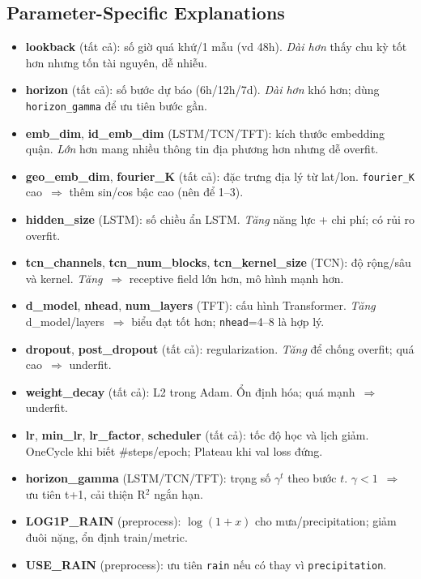 \documentclass[12pt,a4paper]{article}
\begin{document}
\subsection*{Parameter-Specific Explanations}
\begin{itemize}
    \item \textbf{lookback} (tất cả): số giờ quá khứ/1 mẫu (vd 48h). \emph{Dài hơn} thấy chu kỳ tốt hơn nhưng tốn tài nguyên, dễ nhiễu.
    \item \textbf{horizon} (tất cả): số bước dự báo (6h/12h/7d). \emph{Dài hơn} khó hơn; dùng \texttt{horizon\_gamma} để ưu tiên bước gần.
    \item \textbf{emb\_dim}, \textbf{id\_emb\_dim} (LSTM/TCN/TFT): kích thước embedding quận. \emph{Lớn} hơn mang nhiều thông tin địa phương hơn nhưng dễ overfit.
    \item \textbf{geo\_emb\_dim}, \textbf{fourier\_K} (tất cả): đặc trưng địa lý từ lat/lon. \texttt{fourier\_K} cao \,$\Rightarrow$ thêm sin/cos bậc cao (nên để 1--3).
    \item \textbf{hidden\_size} (LSTM): số chiều ẩn LSTM. \emph{Tăng} năng lực + chi phí; có rủi ro overfit.
    \item \textbf{tcn\_channels}, \textbf{tcn\_num\_blocks}, \textbf{tcn\_kernel\_size} (TCN): độ rộng/sâu và kernel. \emph{Tăng} \,$\Rightarrow$ receptive field lớn hơn, mô hình mạnh hơn.
    \item \textbf{d\_model}, \textbf{nhead}, \textbf{num\_layers} (TFT): cấu hình Transformer. \emph{Tăng} d\_model/layers \,$\Rightarrow$ biểu đạt tốt hơn; \texttt{nhead}=4--8 là hợp lý.
    \item \textbf{dropout}, \textbf{post\_dropout} (tất cả): regularization. \emph{Tăng} để chống overfit; quá cao \,$\Rightarrow$ underfit.
    \item \textbf{weight\_decay} (tất cả): L2 trong Adam. Ổn định hóa; quá mạnh \,$\Rightarrow$ underfit.
    \item \textbf{lr}, \textbf{min\_lr}, \textbf{lr\_factor}, \textbf{scheduler} (tất cả): tốc độ học và lịch giảm. OneCycle khi biết \#steps/epoch; Plateau khi val loss đứng.
    \item \textbf{horizon\_gamma} (LSTM/TCN/TFT): trọng số $\gamma^t$ theo bước $t$. $\gamma<1$ \,$\Rightarrow$ ưu tiên t+1, cải thiện R$^2$ ngắn hạn.
    \item \textbf{LOG1P\_RAIN} (preprocess): $\log(1+x)$ cho mưa/precipitation; giảm đuôi nặng, ổn định train/metric.
    \item \textbf{USE\_RAIN} (preprocess): ưu tiên \texttt{rain} nếu có thay vì \texttt{precipitation}.
\end{itemize}
\end{document}
